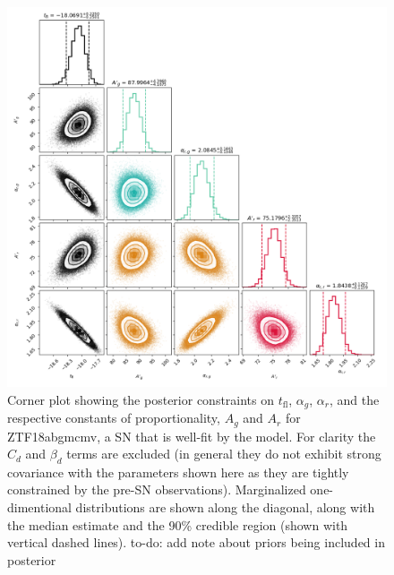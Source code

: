 \documentclass[twocolumn]{aastex63}
\newcommand{\todo}[1]{{\color{magenta} to-do: {#1}}}
\newcommand{\tfl}{$t_\mathrm{fl}$}
\begin{document}
\begin{figure}
    \centering
    \includegraphics[width=1\linewidth]{./figures/ZTF18abgmcmv_corner.png}
    \caption{Corner plot showing the posterior constraints on \tfl,
    $\alpha_g$, $\alpha_r$, and the respective constants of proportionality,
    $A_g$ and $A_r$ for ZTF18abgmcmv, a SN that is well-fit by the model. For
    clarity the $C_d$ and $\beta_d$ terms are excluded (in general they do
    not exhibit strong covariance with the parameters shown here as they are
    tightly constrained by the pre-SN observations). Marginalized
    one-dimentional distributions are shown along the diagonal, along with
    the median estimate and the 90\% credible region (shown with vertical
    dashed lines). \todo{add note about priors being included in posterior}}
    \label{fig:good_corner}
\end{figure}
\end{document}
